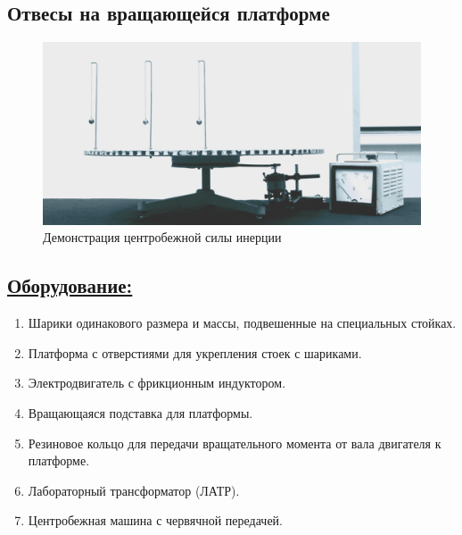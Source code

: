 \documentclass[14pt,a4paper,oneside]{extarticle}	%
\begin{document}
	
	\begin{center}
		\subsection*{Отвесы на вращающейся платформе}
	\end{center}
	
	\begin{figure}[H] 	
		\centering 	
		\includegraphics[width=0.9\linewidth]{platform-1.png}
		\caption{Демонстрация центробежной силы инерции}
		\label{platform-1}
	\end{figure}
	
	\subsection*{\underline{Оборудование:}}

	\begin{enumerate} 
		\item Шарики одинакового размера и массы, подвешенные на специальных стойках.
		\item Платформа с отверстиями для укрепления стоек с шариками.
		\item Электродвигатель с фрикционным индуктором.
		\item Вращающаяся подставка для платформы.
		\item Резиновое кольцо для передачи вращательного момента от вала двигателя к платформе.
		\item Лабораторный трансформатор (ЛАТР).
		\item Центробежная машина с червячной передачей.
	\end{enumerate}
\end{document}
